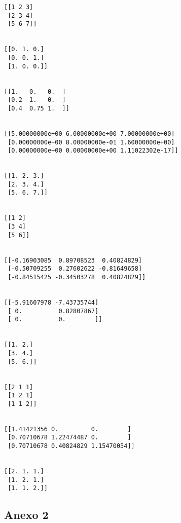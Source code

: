 \documentclass[11pt]{article}
\begin{document}
    \begin{Verbatim}[commandchars=\\\{\}]
[[1 2 3]
 [2 3 4]
 [5 6 7]]


[[0. 1. 0.]
 [0. 0. 1.]
 [1. 0. 0.]]


[[1.   0.   0.  ]
 [0.2  1.   0.  ]
 [0.4  0.75 1.  ]]


[[5.00000000e+00 6.00000000e+00 7.00000000e+00]
 [0.00000000e+00 8.00000000e-01 1.60000000e+00]
 [0.00000000e+00 0.00000000e+00 1.11022302e-17]]


[[1. 2. 3.]
 [2. 3. 4.]
 [5. 6. 7.]]


[[1 2]
 [3 4]
 [5 6]]


[[-0.16903085  0.89708523  0.40824829]
 [-0.50709255  0.27602622 -0.81649658]
 [-0.84515425 -0.34503278  0.40824829]]


[[-5.91607978 -7.43735744]
 [ 0.          0.82807867]
 [ 0.          0.        ]]


[[1. 2.]
 [3. 4.]
 [5. 6.]]


[[2 1 1]
 [1 2 1]
 [1 1 2]]


[[1.41421356 0.         0.        ]
 [0.70710678 1.22474487 0.        ]
 [0.70710678 0.40824829 1.15470054]]


[[2. 1. 1.]
 [1. 2. 1.]
 [1. 1. 2.]]
    \end{Verbatim}

    \hypertarget{anexo-2}{%
\subsection{Anexo 2}\label{anexo-2}}
\end{document}
